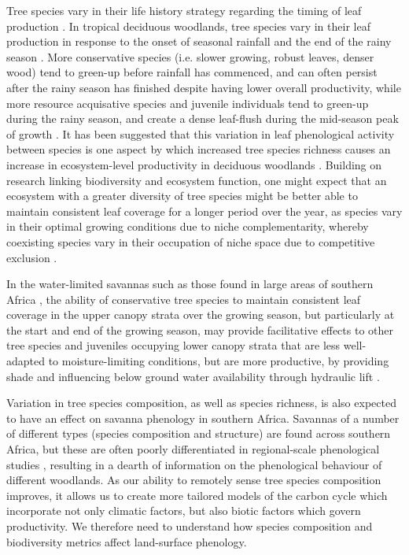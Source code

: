 \documentclass[11pt,a4paper]{article}
\begin{document}
Tree species vary in their life history strategy regarding the timing of leaf production \citep{}. In tropical deciduous woodlands, tree species vary in their leaf production in response to the onset of seasonal rainfall and the end of the rainy season \citep{}. More conservative species (i.e. slower growing, robust leaves, denser wood) tend to green-up before rainfall has commenced, and can often persist after the rainy season has finished despite having lower overall productivity, while more resource acquisative species and juvenile individuals tend to green-up during the rainy season, and create a dense leaf-flush during the mid-season peak of growth \citep{}. It has been suggested that this variation in leaf phenological activity between species is one aspect by which increased tree species richness causes an increase in ecosystem-level productivity in deciduous woodlands \citep{}. Building on research linking biodiversity and ecosystem function, one might expect that an ecosystem with a greater diversity of tree species might be better able to maintain consistent leaf coverage for a longer period over the year, as species vary in their optimal growing conditions due to niche complementarity, whereby coexisting species vary in their occupation of niche space due to competitive exclusion \citep{}. 

In the water-limited savannas such as those found in large areas of southern Africa \citep{}, the ability of conservative tree species to maintain consistent leaf coverage in the upper canopy strata over the growing season, but particularly at the start and end of the growing season, may provide facilitative effects to other tree species and juveniles occupying lower canopy strata that are less well-adapted to moisture-limiting conditions, but are more productive, by providing shade and influencing below ground water availability through hydraulic lift \citep{}. 

Variation in tree species composition, as well as species richness, is also expected to have an effect on savanna phenology in southern Africa. Savannas of a number of different types (species composition and structure) are found across southern Africa, but these are often poorly differentiated in regional-scale phenological studies \citep{}, resulting in a dearth of information on the phenological behaviour of different woodlands. As our ability to remotely sense tree species composition improves, it allows us to create more tailored models of the carbon cycle which incorporate not only climatic factors, but also biotic factors which govern productivity. We therefore need to understand how species composition and biodiversity metrics affect land-surface phenology. 
\end{document}
